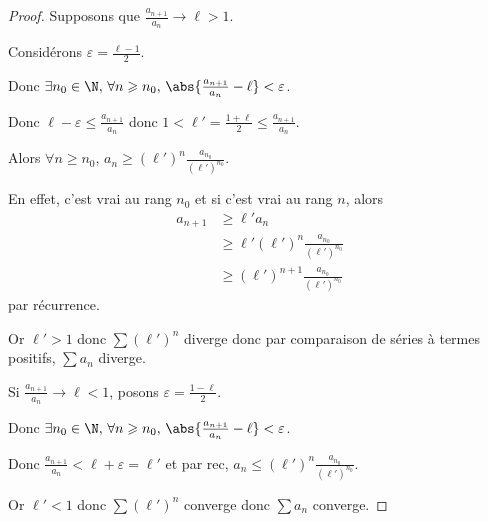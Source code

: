 \begin{proof}
    Supposons que $\frac{a_{n + 1 }}{a_n } \longrightarrow \ell > 1$. 

    Considérons $\varepsilon = \frac{\ell - 1 }{2 }$.

    Donc $\exists n_0 \in \N, \, \forall n \geqslant n_0, \, \abs{\frac{a_{n + 1}}{a_n} - \ell} < \varepsilon$.

    Donc $\ell - \varepsilon \leqslant \frac{a_{n + 1}}{a_n} $ donc $1 < \ell' = \frac{1 + \ell  }{2} \leqslant \frac{a_{n + 1}}{a_n}$.

    Alors $\displaystyle \forall n \geqslant n_0$, $\displaystyle a_n \geqslant (\ell')^n \frac{a_{n_0}}{(\ell')^{n_0}}$.

    En effet, c'est vrai au rang $n_0$ et si c'est vrai au rang $n$, 
    alors 
    \begin{align*}
        a_{n + 1} & \geqslant \ell' a_n \\
                  & \geqslant \ell' (\ell')^n \frac{a_{n_0}}{(\ell')^{n_0}} \\
                  & \geqslant (\ell')^{n + 1} \frac{a_{n_0}}{(\ell')^{n_0}}
    \end{align*} par récurrence. 


    Or $\ell' > 1$ donc $\sum (\ell')^n$ diverge donc par comparaison de séries à termes positifs, 
    $\sum a_n$ diverge.

    Si $\frac{a_{n + 1}}{a_n} \longrightarrow \ell < 1$, posons $\varepsilon = \frac{1 - \ell}{2}$.

    Donc $\exists n_0 \in \N, \, \forall n \geqslant n_0, \, \abs{\frac{a_{n + 1}}{a_n} - \ell} < \varepsilon$.

    Donc $\frac{a_{n + 1}}{a_n} < \ell + \varepsilon = \ell'$ et par rec, $a_n \leqslant (\ell')^{n} \frac{a_{n_0}}{(\ell')^{n_0}}$.

    Or $\ell' < 1$ donc $\sum (\ell')^n$ converge donc $\sum a_n$ converge. 

\end{proof}


